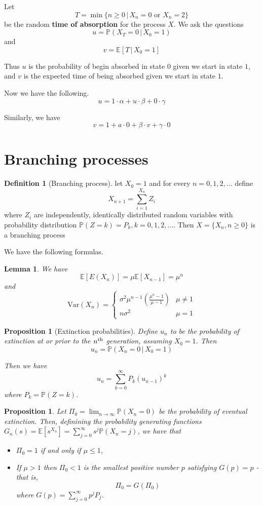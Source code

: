 \documentclass[10pt, oneside, reqno]{amsart}
\theoremstyle{plain}%
\newtheorem{lem}[thm]{Lemma}
\newtheorem{prop}[thm]{Proposition}
\theoremstyle{definition}
\newtheorem{defn}[thm]{Definition}
\theoremstyle{remark}
\newcommand{\expc}[1]{\mathbb{E}\left[#1\right]}
\newcommand{\var}[1]{\text{Var}\left(#1\right)}
\newcommand{\prob}[1]{\mathbb{P}(#1)}
\newcommand{\given}{ \, | \,}
\newcommand{\nth}{n\textsuperscript{th}}
\begin{document}
Let \[T = \min \{n \geq 0 \given X_n = 0 \text{ or } X_n = 2 \}\]
be the random \textbf{time of absorption} for the process $X$.  We ask the questions \[
	u = \prob{X_T = 0 \given X_0 = 1} 
\] and \[
	v = \expc{T \given X_0 = 1}
\]

Thus $u$ is the probability of begin absorbed in state $0$ given we start in state $1$, and $v$ is the expected time of being absorbed given we start in state $1$.

Now we have the following.\[
	u = 1\cdot \alpha + u \cdot \beta + 0 \cdot \gamma
\]

Similarly, we have 
\[
	v = 1 + a \cdot 0 + \beta \cdot v + \gamma \cdot 0
\]


\section{Branching processes} %
\label{sub:branching_processes}

\begin{defn}[Branching process]
	let $X_0 = 1$ and for every $n = 0,1,2,\dots$ define\[
		X_{n+1} = \sum_{i=1}^{X_n} Z_i
	\]
	where $Z_i$ are independently, identically distributed random variables with probability distribution $\prob{Z=k} = P_k, k = 0,1,2,\dots$.  Then $X = \{ X_n, n \geq 0 \}$ is a branching process
\end{defn}

We have the following formulas.

\begin{lem}
	We have \[
		\expc{E(X_n)} = \mu \expc{X_{n-1}} = \mu^n
 	\]
and \[
	\var{X_n} = \begin{cases}
		\sigma^2 \mu^{n-1} \left( \frac{\mu^n - 1}{\mu - 1}\right) &\mu \neq 1 \\
		n \sigma^2 &\mu = 1
	\end{cases}
\]
\end{lem}

\begin{prop}[Extinction probabilities]
	Define $u_n$ to be the probability of extinction at or prior to the $\nth$ generation, assuming $X_0 = 1$.  Then \[
		u_n = \prob{X_n = 0 \given X_0 = 1}
	\]

Then we have \[
	u_n = \sum_{k=0}^\infty P_k (u_{n-1})^k
\] where $P_k = \prob{Z = k}$.
\end{prop}

\begin{prop}
	Let $\Pi_0 = \lim_{n \rightarrow \infty} \prob{X_n = 0}$ be the probability of eventual extinction.  Then, definining the probability generating functions $G_n(s) = \expc{s^{X_n}} = \sum_{j=0}^\infty s^j \prob{X_n = j}$, we have that 
	\begin{itemize}
		\item $\Pi_0 = 1$ if and only if $\mu \leq 1$,
		\item If $\mu > 1$ then $\Pi_0 < 1$ is the smallest positive number $p$ satisfying $G(p) = p$ - that is, \[
			\Pi_0 = G(\Pi_0)
		\] where $G(p) = \sum_{j=0}^\infty p^j P_j$.
	\end{itemize}
\end{prop}
\end{document}
